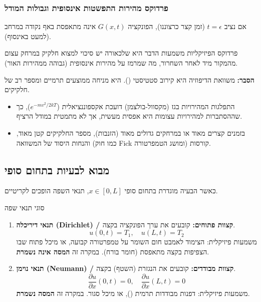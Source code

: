 \subsubsection{פרדוקס מהירות התפשטות אינסופית וגבולות המודל}
אם נציב $t=\epsilon$ (זמן קצר כרצוננו), הפונקציה $G(x,t)$ אינה מתאפסת באף נקודה במרחב (למעט באינסוף).
\begin{notebox}{פרדוקס הפיזיקליות}
    משמעות הדבר היא שלכאורה יש סיכוי למצוא חלקיק במרחק עצום מהמקור מיד לאחר השחרור, מה שמרמז על מהירות אינסופית (גבוהה ממהירות האור).
    
    \textbf{הסבר:} משוואת הדיפוזיה היא קירוב סטטיסטי (). היא מניחה ממוצעים תרמיים ומספר רב של חלקיקים.
    \begin{itemize}
        \item התפלגות המהירויות בגז (מקסוול-בולצמן) דועכת אקספוננציאלית ($e^{-mv^2/2kT}$), כך שההסתברות למהירויות עצומות היא אפסית מעשית, אך לא מתמטית במודל הרציף.
        \item בזמנים קצרים מאוד או במרחקים גדולים מאוד (הזנבות), מספר החלקיקים קטן מאוד, והנחות היסוד של המשוואה (כמו חוק Fick ומושג הטמפרטורה) קורסות.
    \end{itemize}
\end{notebox}

\subsection{מבוא לבעיות בתחום סופי}
כאשר הבעיה מוגדרת בתחום סופי $x \in [0, L]$, תנאי השפה הופכים לקריטיים.

\begin{definitionbox}{סוגי תנאי שפה}
    \begin{enumerate}
        \item \textbf{תנאי דיריכלה (Dirichlet) / קצוות פתוחים:}
        קובעים את ערך הפונקציה בקצה.
        \[ u(0,t) = T_1, \quad u(L,t) = T_2 \]
        משמעות פיזיקלית: הצימוד לאמבט חום השומר על טמפרטורה קבועה, או מיכל פתוח שבו הצפיפות בקצה מתאפסת (חומר בורח). במקרה זה \textbf{המסה אינה נשמרת}.
        
        \item \textbf{תנאי נוימן (Neumann) / קצוות מבודדים:}
        קובעים את הנגזרת (השטף) בקצה.
        \[ \frac{\partial u}{\partial x}(0,t) = 0, \quad \frac{\partial u}{\partial x}(L,t) = 0 \]
        משמעות פיזיקלית: דפנות מבודדות תרמית (), או מיכל סגור. במקרה זה \textbf{המסה נשמרת}.
    \end{enumerate}
\end{definitionbox}

